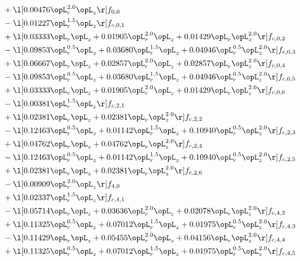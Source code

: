 \begin{alignat}{2}
& + \l[  0.00476 \opL_r^{2.0} \opL_z  \r] f_{0,0} \nonumber \\ 
& - \l[  0.01227 \opL_r^{1.5} \opL_z  \r] f_{c,0,1} \nonumber \\ 
& + \l[  0.03333 \opL_r \opL_z +  0.01905 \opL_r^{2.0} \opL_z +  0.01429 \opL_r \opL_z^{2.0}  \r] f_{c,0,2} \nonumber \\ 
& - \l[  0.09853 \opL_r^{0.5} \opL_z +  0.03680 \opL_r^{1.5} \opL_z +  0.04946 \opL_r^{0.5} \opL_z^{2.0}  \r] f_{c,0,3} \nonumber \\ 
& + \l[  0.06667 \opL_r \opL_z +  0.02857 \opL_r^{2.0} \opL_z +  0.02857 \opL_r \opL_z^{2.0}  \r] f_{c,0,4} \nonumber \\ 
& - \l[  0.09853 \opL_r^{0.5} \opL_z +  0.03680 \opL_r^{1.5} \opL_z +  0.04946 \opL_r^{0.5} \opL_z^{2.0}  \r] f_{c,0,5} \nonumber \\ 
& + \l[  0.03333 \opL_r \opL_z +  0.01905 \opL_r^{2.0} \opL_z +  0.01429 \opL_r \opL_z^{2.0}  \r] f_{c,0,6} \nonumber \\ 
& - \l[  0.00381 \opL_r^{1.5} \opL_z  \r] f_{c,2,1} \nonumber \\ 
& + \l[  0.02381 \opL_r \opL_z +  0.02381 \opL_r \opL_z^{2.0}  \r] f_{c,2,2} \nonumber \\ 
& - \l[  0.12463 \opL_r^{0.5} \opL_z +  0.01142 \opL_r^{1.5} \opL_z +  0.10940 \opL_r^{0.5} \opL_z^{2.0}  \r] f_{c,2,3} \nonumber \\ 
& + \l[  0.04762 \opL_r \opL_z +  0.04762 \opL_r \opL_z^{2.0}  \r] f_{c,2,4} \nonumber \\ 
& - \l[  0.12463 \opL_r^{0.5} \opL_z +  0.01142 \opL_r^{1.5} \opL_z +  0.10940 \opL_r^{0.5} \opL_z^{2.0}  \r] f_{c,2,5} \nonumber \\ 
& + \l[  0.02381 \opL_r \opL_z +  0.02381 \opL_r \opL_z^{2.0}  \r] f_{c,2,6} \nonumber \\ 
& - \l[  0.00909 \opL_r^{2.0} \opL_z  \r] f_{4,0} \nonumber \\ 
& + \l[  0.02337 \opL_r^{1.5} \opL_z  \r] f_{c,4,1} \nonumber \\ 
& - \l[  0.05714 \opL_r \opL_z +  0.03636 \opL_r^{2.0} \opL_z +  0.02078 \opL_r \opL_z^{2.0}  \r] f_{c,4,2} \nonumber \\ 
& + \l[  0.11325 \opL_r^{0.5} \opL_z +  0.07012 \opL_r^{1.5} \opL_z +  0.01975 \opL_r^{0.5} \opL_z^{2.0}  \r] f_{c,4,3} \nonumber \\ 
& - \l[  0.11429 \opL_r \opL_z +  0.05455 \opL_r^{2.0} \opL_z +  0.04156 \opL_r \opL_z^{2.0}  \r] f_{c,4,4} \nonumber \\ 
& + \l[  0.11325 \opL_r^{0.5} \opL_z +  0.07012 \opL_r^{1.5} \opL_z +  0.01975 \opL_r^{0.5} \opL_z^{2.0}  \r] f_{c,4,5} \nonumber \\ 

\end{alignat}
